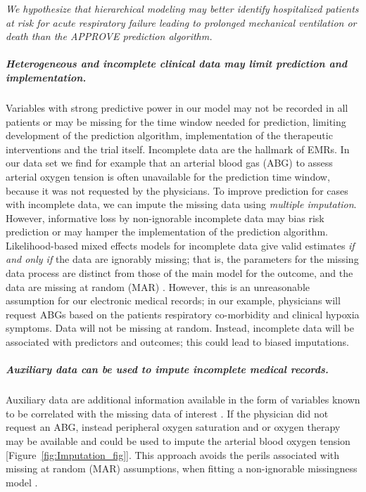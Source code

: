 \documentclass[11pt,notitlepage]{article}
\begin{document}
\emph{We hypothesize that hierarchical modeling may better identify hospitalized patients at risk for acute respiratory failure leading to prolonged mechanical ventilation or death than the APPROVE prediction algorithm.}

\subparagraph*{Heterogeneous and incomplete clinical data may limit prediction and implementation.}
Variables with strong predictive power in our model may not be recorded in all patients or may be missing for the time window needed for prediction, limiting development of the prediction algorithm, implementation of the therapeutic interventions and the trial itself. Incomplete data are the hallmark of EMRs. In our data set we find for example that an arterial blood gas (ABG) to assess arterial oxygen tension is often unavailable for the prediction time window, because it was not requested by the physicians. To improve prediction for cases with incomplete data, we can impute the missing data using \textit{multiple imputation}. However, informative loss by non-ignorable incomplete data may bias risk prediction or may hamper the implementation of the prediction algorithm. Likelihood-based mixed effects models for incomplete data give valid estimates \textit{if and only if } the data are ignorably missing; that is, the parameters for the missing data process are distinct from those of the main model for the outcome, and the data are missing at random (MAR) \cite{Rubin_1976}. However, this is an unreasonable assumption for our electronic medical records; in our example, physicians will request ABGs based on the patients respiratory co-morbidity and clinical hypoxia symptoms. Data will not be missing at random. Instead, incomplete data will be associated with predictors and outcomes; this could lead to biased imputations.

\subparagraph*{Auxiliary data can be used to impute incomplete medical records.} Auxiliary data are additional information available in the form of variables known to be correlated with the missing data of interest \cite{Daniels24571539}. If the physician did not request an ABG, instead peripheral oxygen saturation and or oxygen therapy may be available and could be used to impute the arterial blood oxygen tension [Figure~\ref{fig:Imputation_fig}]. This approach avoids the perils associated with missing at random (MAR) assumptions, when fitting a non-ignorable missingness model \cite{Wang_20029935}.
\end{document}
